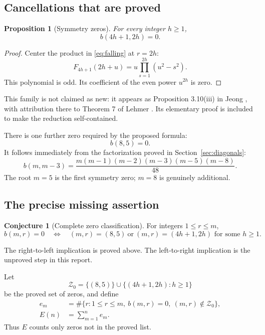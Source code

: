 \documentclass[11pt,a4paper]{article}
\numberwithin{equation}{section}
\newtheorem{proposition}[theorem]{Proposition}
\theoremstyle{definition}
\newtheorem{conjecture}[theorem]{Conjecture}
\theoremstyle{remark}
\newcommand{\ZZ}{\mathcal Z}
\begin{document}
\subsection{Cancellations that are proved}
\begin{proposition}[Symmetry zeros]\label{prop:symmetry}
For every integer $h\ge1$,
\begin{equation}\label{eq:symmetry}
 b(4h+1,2h)=0.
\end{equation}
\end{proposition}
\begin{proof}
Center the product in \eqref{eq:falling} at $r=2h$:
\[
 F_{4h+1}(2h+u)=u\prod_{s=1}^{2h}(u^2-s^2).
\]
This polynomial is odd. Its coefficient of the even power $u^{2h}$ is zero.
\end{proof}

This family is not claimed as new: it appears as Proposition 3.10(iii) in
Jeong \cite{jeong}, with attribution there to Theorem 7 of Lehmer
\cite{lehmer}. Its elementary proof is included to make the reduction
self-contained.

There is one further zero required by the proposed formula:
\begin{equation}\label{eq:exception}
 b(8,5)=0.
\end{equation}
It follows immediately from the factorization proved in
Section~\ref{sec:diagonals}:
\[
 b(m,m-3)=\frac{m(m-1)(m-2)(m-3)(m-5)(m-8)}{48}.
\]
The root $m=5$ is the first symmetry zero; $m=8$ is genuinely additional.

\subsection{The precise missing assertion}
\begin{conjecture}[Complete zero classification]\label{conj:zeros}
For integers $1\le r\le m$,
\begin{equation}\label{eq:zeroconj}
 b(m,r)=0\quad\Longleftrightarrow\quad
 (m,r)=(8,5)\ \text{or}\ (m,r)=(4h+1,2h)\text{ for some }h\ge1.
\end{equation}
\end{conjecture}

The right-to-left implication is proved above. The left-to-right implication
is the unproved step in this report.

Let
\[
 \ZZ_0=\{(8,5)\}\cup\{(4h+1,2h):h\ge1\}
\]
be the proved set of zeros, and define
\begin{align*}
 e_m&=\#\{r:1\le r\le m,\ b(m,r)=0,\ (m,r)\notin\ZZ_0\},\\
 E(n)&=\sum_{m=1}^n e_m.
\end{align*}
Thus $E$ counts only zeros not in the proved list.
\end{document}
